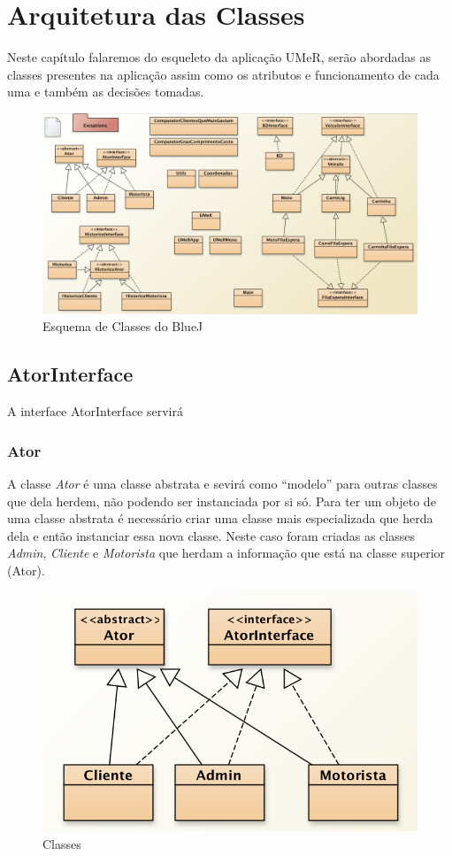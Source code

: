 \chapter{Arquitetura das Classes}
Neste capítulo falaremos do esqueleto da  aplicação UMeR, serão abordadas as classes presentes na aplicação assim como os atributos e funcionamento de cada uma e também as decisões tomadas.
\begin{figure}[htb]
	\centering
	\includegraphics[scale=0.45]{imagem/esquemaClasses}
	\caption{Esquema de Classes do BlueJ }
	\label{p2:fig:p2_classes}
\end{figure}

\newpage

\section{AtorInterface}
A interface AtorInterface servirá
 

\subsection{ Ator}
A classe  \textit{Ator} é uma classe abstrata e sevirá  como “modelo” para outras classes que dela herdem, não podendo ser instanciada por si só. Para ter um objeto de uma classe abstrata é necessário criar uma classe mais especializada que herda dela e então instanciar essa nova classe. Neste caso foram criadas as classes \textit{Admin}, \textit{Cliente} e  \textit{Motorista} que herdam a informação que está na classe superior (Ator).

\begin{figure}[htpb]
	\centering
	\includegraphics[scale=0.6]{imagem/atores}
	\caption{Classes }
	\label{p2:fig:p2_atoresr}
\end{figure}

